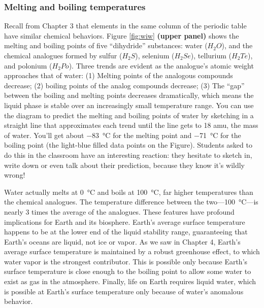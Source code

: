 \documentclass[amstex,12pt]{book}
\begin{document}
\subsubsection{Melting and boiling temperatures}
Recall from Chapter 3 that elements in the same column of the periodic table have similar chemical behaviors. Figure \ref{fig:wiw} \textbf{(upper panel)} shows the melting and boiling points of five ``dihydride'' substances: water ($H_2O$), and the chemical analogues formed by sulfur ($H_2S$), selenium ($H_2Se$), tellurium ($H_2Te$), and polonium ($H_2Po$). Three trends are evident as the analogue's atomic weight approaches that of water: (1) Melting points of the analogous compounds decrease; (2) boiling points of the analog compounds decrease; (3) The ``gap'' between the boiling and melting points decreases dramatically, which means the liquid phase is stable over an increasingly small temperature range. You can use the diagram to predict the melting and boiling points of water by sketching in a straight line that approximates each trend until the line gets to 18 amu, the mass of water. You'll get about \SI{-83}{\degreeCelsius} for the melting point and \SI{-71}{\degreeCelsius} for the boiling point (the light-blue filled data points on the Figure). Students asked to do this in the classroom have an interesting reaction: they hesitate to sketch in, write down or even talk about their prediction, because they know it's wildly wrong!

Water actually melts at \SI{0}{\degreeCelsius} and boils at \SI{100}{\degreeCelsius}, far higher temperatures than the chemical analogues. The temperature difference between the two---\SI{100}{\degreeCelsius}---is nearly 3 times the average of the analogues. These features have profound implications for Earth and its biosphere. Earth's average surface temperature happens to be at the lower end of the liquid stability range, guaranteeing that Earth's oceans are liquid, not ice or vapor.  As we saw in Chapter 4, Earth’s average surface temperature is maintained by a robust greenhouse effect, to which water vapor is the strongest contributor. This is possible only because Earth's surface temperature is close enough to the boiling point to allow some water to exist as gas in the atmosphere. Finally, life on Earth requires liquid water, which is possible at Earth's surface temperature only because of water's anomalous behavior.
 
\end{document}
